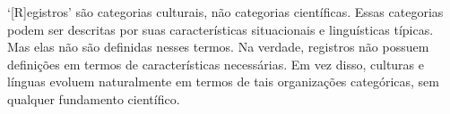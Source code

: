 \begin{titlepage}
    \vspace*{\fill}
    \epigraph{`[R]egistros' são categorias culturais, não categorias científicas. Essas categorias podem ser descritas por suas características situacionais e linguísticas típicas. Mas elas não são definidas nesses termos. Na verdade, registros não possuem definições em termos de características necessárias. Em vez disso, culturas e línguas evoluem naturalmente em termos de tais organizações categóricas, sem qualquer fundamento científico.}{\citet[p.~16]{biberWhatRegisterAccounting2023}}
\end{titlepage}

